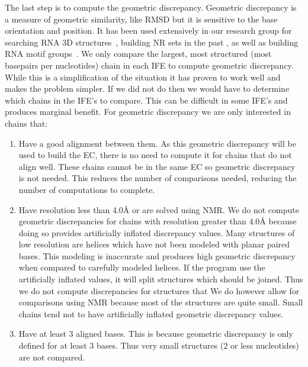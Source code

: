 The last step is to compute the geometric discrepancy. Geometric discrepancy is
a measure of geometric similarity, like RMSD but it is sensitive to the base
orientation and position. It has been used extensively in our research group for
searching RNA 3D structures~\cite{Sarver2008a}, building NR sets in the past
\cite{Leontis2012b}, as well as building RNA motif groups~\cite{Petrov2013}. We
only compare the largest, most structured (most basepairs per nucleotides) chain
in each IFE to compute geometric discrepancy. While this is a simplification of
the situation it has proven to work well and makes the problem simpler. If we
did not do then we would have to determine which chains in the IFE's to compare.
This can be difficult in some IFE's and produces marginal benefit. For geometric
discrepancy we are only interested in chains that:

\begin{enumerate}
  \item Have a good alignment between them. As this geometric discrepancy will
    be used to build the EC, there is no need to compute it for chains that do not
    align well. These chains cannot be in the same EC so geometric
    discrepancy is not needed. This reduces the number of comparisons needed,
    reducing the number of computations to complete.

  \item Have resolution less than 4.0{\AA} or are solved using NMR\@. We do not
    compute geometric discrepancies for chains with resolution greater than
    4.0{\AA} because doing so provides artificially inflated discrepancy values.
    Many structures of low resolution are helices which have not been modeled
    with planar paired bases. This modeling is inaccurate and produces high
    geometric discrepancy when compared to carefully modeled helices. If the
    program use the artificially inflated values, it will split structures which
    should be joined. Thus we do not compute discrepancies for structures that
    We do however allow for comparisons using NMR because most of the structures
    are quite small. Small chains tend not to have artificially inflated geometric
    discrepancy values.

  \item Have at least 3 aligned bases. This is because geometric discrepancy is only
    defined for at least 3 bases. Thus very small structures (2 or less
    nucleotides) are not compared.
\end{enumerate}

